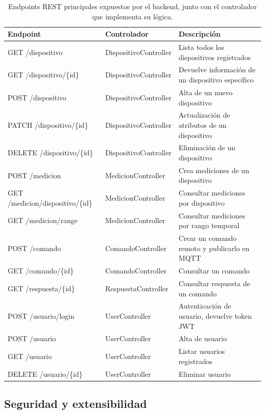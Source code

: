 \begin{table}[H]
	\centering
	\caption[Endpoints REST principales]{Endpoints REST principales expuestos por el backend, junto con el controlador que implementa su lógica.}
	\begin{tabular}{l l p{3.4cm}}    
		\toprule
		\textbf{Endpoint} & \textbf{Controlador} & \textbf{Descripción} \\
		\midrule
		GET /dispositivo & DispositivoController & Lista todos los dispositivos registrados \\
		GET /dispositivo/\{id\} & DispositivoController & Devuelve información de un dispositivo específico \\
		POST /dispositivo & DispositivoController & Alta de un nuevo dispositivo \\
		PATCH /dispositivo/\{id\} & DispositivoController & Actualización de atributos de un dispositivo \\
		DELETE /dispositivo/\{id\} & DispositivoController & Eliminación de un dispositivo \\
		\addlinespace
		POST /medicion & MedicionController & Crea  mediciones de un dispositivo \\
		GET /medicion/dispositivo/\{id\} & MedicionController & Consultar mediciones por dispositivo \\
		GET /medicion/range & MedicionController & Consultar mediciones por rango temporal \\
		\addlinespace
		POST /comando & ComandoController & Crear un comando remoto y publicarlo en MQTT \\
		GET /comando/\{id\} & ComandoController & Consultar un comando  \\
		\addlinespace
		GET /respuesta/\{id\} & RespuestaController & Consultar respuesta de un comando \\
		\addlinespace
		POST /usuario/login & UserController & Autenticación de usuario, devuelve token JWT \\
		POST /usuario & UserController & Alta de usuario \\
		GET /usuario & UserController & Listar usuarios registrados \\
		DELETE /usuario/\{id\} & UserController & Eliminar usuario \\
		\bottomrule
		\hline
	\end{tabular}
	\label{tab:endpoints}
\end{table}


\subsection{Seguridad y extensibilidad}

